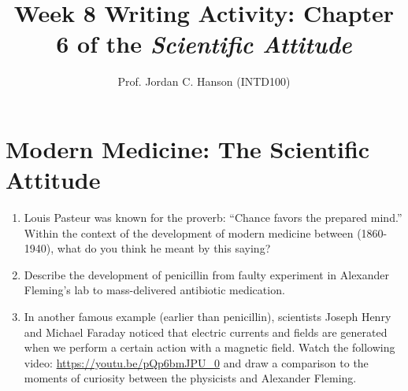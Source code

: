 \documentclass{article}
\begin{document}
\title{Week 8 Writing Activity: Chapter 6 of the \textit{Scientific Attitude}}
\author{Prof. Jordan C. Hanson (INTD100)}

\maketitle

\section{Modern Medicine: The Scientific Attitude}

\begin{enumerate}
\item Louis Pasteur was known for the proverb: ``Chance favors the prepared mind.'' Within the context of the development of modern medicine between (1860-1940), what do you think he meant by this saying? \\ \vspace{3cm}
\item Describe the development of penicillin from faulty experiment in Alexander Fleming's lab to mass-delivered antibiotic medication. \\ \vspace{2cm}
\item In another famous example (earlier than penicillin), scientists Joseph Henry and Michael Faraday noticed that electric currents and fields are generated when we perform a certain action with a magnetic field.  Watch the following video: \url{https://youtu.be/pQp6bmJPU_0} and draw a comparison to the moments of curiosity between the physicists and Alexander Fleming.
\end{enumerate}
\end{document}
